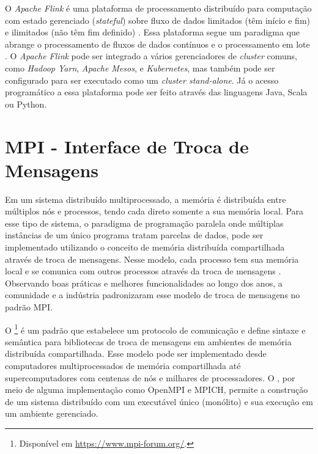 O \emph{Apache Flink} é uma plataforma de processamento distribuído para
computação com estado gerenciado (\emph{stateful}) sobre fluxo de dados limitados (têm início e
fim) e ilimitados (não têm fim definido) \cite{ApacheFlink2020}.
Essa plataforma segue um paradigma que abrange o processamento de fluxos de
dados contínuos e o processamento em lote \cite{Carbone2015,Lopez2018}.
O \emph{Apache Flink} pode ser integrado a vários gerenciadores de \emph{cluster}
comuns, como \emph{Hadoop Yarn}, \emph{Apache Mesos}, e \emph{Kubernetes}, mas também pode ser
configurado para ser executado como um \emph{cluster stand-alone}.
Já o acesso programático a essa plataforma pode ser feito através das linguagens
Java, Scala ou Python.

\section{MPI - Interface de Troca de Mensagens}

Em um sistema distribuído multiprocessado, a memória é distribuída entre
múltiplos nós e processos, tendo cada  direto somente a sua memória
local.
Para esse tipo de sistema, o paradigma de programação paralela \spmd onde
múltiplas instâncias de um único programa tratam parcelas de dados, pode ser
implementado utilizando o conceito de memória distribuída compartilhada através
de troca de mensagens.
Nesse modelo, cada
processo tem sua memória local e se comunica com outros processos através da
troca de mensagens \cite{mpi-book}.
Observando boas práticas e melhores funcionalidades ao longo dos anos, a
comunidade e a indústria padronizaram esse modelo de troca de mensagens no
padrão \acf{MPI}.

O \mpi\footnote{Disponível em \url{https://www.mpi-forum.org/}.} é um padrão que
estabelece um protocolo de comunicação e define sintaxe e semântica para
bibliotecas de troca de mensagens em ambientes de memória distribuída compartilhada.
Esse modelo pode ser implementado desde computadores multiprocessados de memória
compartilhada até supercomputadores com centenas de nós e milhares de
processadores.
O \mpi, por meio de alguma
implementação como OpenMPI e MPICH, permite a construção de um sistema
distribuído com um executável único (monólito) e sua execução em um ambiente gerenciado.

